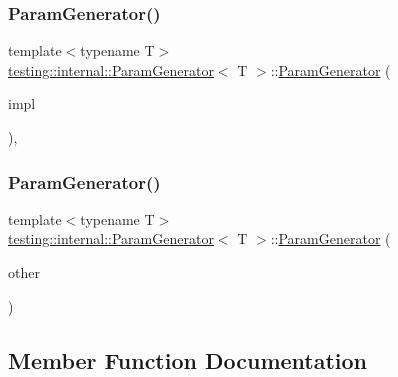 \subsubsection{\texorpdfstring{Param\+Generator()}{ParamGenerator()}\hspace{0.1cm}{\footnotesize\ttfamily [1/2]}}
{\footnotesize\ttfamily template$<$typename T$>$ \\
\hyperlink{classtesting_1_1internal_1_1ParamGenerator}{testing\+::internal\+::\+Param\+Generator}$<$ T $>$\+::\hyperlink{classtesting_1_1internal_1_1ParamGenerator}{Param\+Generator} (\begin{DoxyParamCaption}\item[{\hyperlink{classtesting_1_1internal_1_1ParamGeneratorInterface}{Param\+Generator\+Interface}$<$ T $>$ $\ast$}]{impl }\end{DoxyParamCaption})\hspace{0.3cm}{\ttfamily [inline]}, {\ttfamily [explicit]}}

\mbox{\label{classtesting_1_1internal_1_1ParamGenerator_a5891d25c31919b3099489f8bbcd58b5e}} 
\subsubsection{\texorpdfstring{Param\+Generator()}{ParamGenerator()}\hspace{0.1cm}{\footnotesize\ttfamily [2/2]}}
{\footnotesize\ttfamily template$<$typename T$>$ \\
\hyperlink{classtesting_1_1internal_1_1ParamGenerator}{testing\+::internal\+::\+Param\+Generator}$<$ T $>$\+::\hyperlink{classtesting_1_1internal_1_1ParamGenerator}{Param\+Generator} (\begin{DoxyParamCaption}\item[{const \hyperlink{classtesting_1_1internal_1_1ParamGenerator}{Param\+Generator}$<$ T $>$ \&}]{other }\end{DoxyParamCaption})\hspace{0.3cm}{\ttfamily [inline]}}



\subsection{Member Function Documentation}
\mbox{\label{classtesting_1_1internal_1_1ParamGenerator_a14e735c8bd113556ae905a560cd2d607}} 
